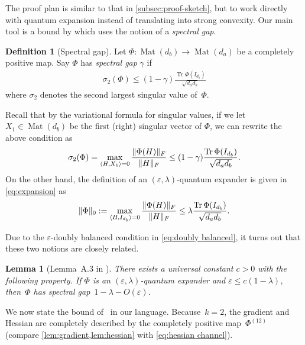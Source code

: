 \documentclass[aos]{imsart}
\newtheorem{lemma}[theorem]{Lemma}
\theoremstyle{definition}
\newtheorem*{definition}{Definition}
\numberwithin{equation}{section}
\DeclareMathOperator{\Mat}{Mat}
\DeclareMathOperator{\tr}{Tr}
\DeclarePairedDelimiter{\norm}{\lVert}{\rVert}
\newcommand{\eps}{\varepsilon}
\begin{document}
The proof plan is similar to that in \cref{subsec:proof-sketch}, but to work directly with quantum expansion instead of translating into strong convexity.
Our main tool is a bound by \cite{KLR19} which uses the notion of a \emph{spectral gap}.

\begin{definition}[Spectral gap]
Let $\Phi\colon\Mat(d_b) \to \Mat(d_a)$ be a completely positive map.
Say $\Phi$ has \emph{spectral gap} $\gamma$ if
\begin{align}\label{eq:spectral-gap}
  \sigma_2(\Phi) \leq (1 - \gamma) \frac{\tr \Phi(I_{d_b})}{\sqrt{d_a d_b}}
\end{align}
where $\sigma_2$ denotes the second largest singular value of~$\Phi$.
\end{definition}

Recall that by the variational formula for singular values, if we let $X_{1} \in \Mat(d_{b})$ be the first (right) singular vector of $\Phi$, we can rewrite the above condition as 
\begin{align*}
  \sigma_2(\Phi) = \max_{\langle H, X_{1} \rangle = 0} \frac{\norm{\Phi(H)}_{F}}{\norm{H}_{F}} \leq (1 - \gamma) \frac{\tr \Phi(I_{d_b})}{\sqrt{d_a d_b}} .
\end{align*}
On the other hand, the definition of an $(\eps,\lambda)$-quantum expander is given in \cref{eq:expansion} as
\begin{align*}
      \norm{\Phi}_0 := \max_{\langle H, I_{d_{b}} \rangle = 0} \frac{\norm{\Phi(H)}_F}{\norm{H}_{F}} 
\leq \lambda \frac{\tr \Phi(I_{d_b})}{\sqrt{d_a d_b}}  .
\end{align*}

Due to the $\eps$-doubly balanced condition in \cref{eq:doubly balanced}, it turns out that these two notions are closely related. 
\begin{lemma}[Lemma~A.3 in \cite{FM20}]\label{lem:fm20}
There exists a universal constant $c>0$ with the following property.
If $\Phi$ is an $(\eps,\lambda)$-quantum expander and $\eps \leq c(1-\lambda)$, then~$\Phi$ has spectral gap~$1-\lambda-O(\eps)$.
\end{lemma}

We now state the bound of~\cite{KLR19} in our language.
Because~$k = 2$, the gradient and Hessian are completely described by the completely positive map~$\Phi^{(12)}$ (compare \cref{lem:gradient,lem:hessian} with \cref{eq:hessian channel}).
\end{document}
